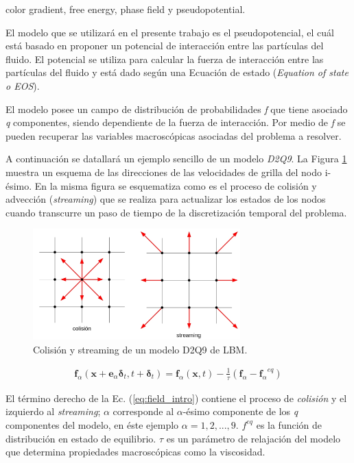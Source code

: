 \qquad \qquad color gradient, free energy, phase field y pseudopotential.

El modelo que se utilizará en el presente trabajo es el pseudopotencial, el cuál está basado en proponer un potencial de interacción entre las partículas del fluido. El potencial se utiliza para calcular la fuerza de interacción entre las partículas del fluido y está dado según una Ecuación de estado (\textit{Equation of state o EOS}). 

El modelo posee un campo de distribución de probabilidades \textit{f} que tiene asociado \textit{q} componentes, siendo dependiente de la fuerza de interacción. Por medio de \textit{f} se pueden recuperar las variables macroscópicas asociadas del problema a resolver.

A continuación se datallará un ejemplo sencillo de un modelo \textit{D2Q9}. La Figura \ref{fig:grilla_D2Q9} muestra un esquema de las direcciones de las velocidades de grilla del nodo i-ésimo. En la misma figura se esquematiza como  es el proceso de colisión y advección (\textit{streaming}) que se realiza para actualizar los estados de los nodos cuando transcurre un paso de tiempo de la discretización temporal del problema. 


\begin{figure}[h!]
	\centering
	\includegraphics[width=8cm]{grilla_stre_colli_intro.png}
	\caption{Colisión y streaming de un modelo D2Q9 de LBM.}
	\label{fig:grilla_D2Q9}
\end{figure}


\begin{align}
	\mathbf{f}_{\alpha} (\mathbf{x} + \mathbf{e}_{\alpha} \mathbf{\delta}_{t}, t + \mathbf{\delta}_{t})  = \mathbf{f}_{\alpha} (\mathbf{x}, t) - \frac{1}{\tau} (\mathbf{f}_{\alpha} - {\mathbf{f}_{\alpha}}^{eq})
	\label{eq:field_intro} 
\end{align}

El término derecho de la Ec. (\ref{eq:field_intro}) contiene el proceso de \textit{colisión} y el izquierdo al \textit{streaming}; $\alpha$ corresponde al  $\alpha$-ésimo componente de los \textit{q} componentes del modelo, en éste ejemplo $\alpha = 1, 2, ...,9$. $f^{eq}$ es la función de distribución en estado de equilibrio. $\tau$ es un parámetro de relajación del modelo que determina propiedades macroscópicas como la viscosidad.

